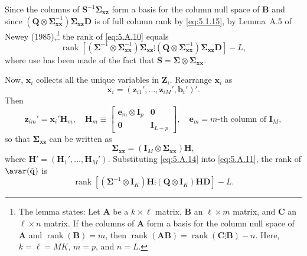 Since the columns of $\mathbf{S}^{-1}\boldsymbol{\Sigma}_{\mathbf{xz}}$ form a basis for the column null space of $\mathbf{B}$ and
since $(\mathbf{Q} \otimes \boldsymbol{\Sigma}_{\mathbf{xx}}^{-1})\boldsymbol{\Sigma}_{\mathbf{xz}}\mathbf{D}$
is of full column rank by \eqref{eq:5.1.15}, by Lemma~A.5 of Newey
(1985),\footnote{The lemma states: Let $\mathbf{A}$ be a $k \times \ell$ matrix,
$\mathbf{B}$ an $\ell \times m$ matrix, and $\mathbf{C}$ an $\ell \times n$ matrix.
If the columns of $\mathbf{A}$ form a basis for the column null space of $\mathbf{A}$ and
$\operatorname{rank}(\mathbf{B}) = m$, then $\operatorname{rank}(\mathbf{AB}) = \operatorname{rank}(\mathbf{C} \vdots \mathbf{B}) - n$.
Here, $k = \ell = MK$, $m = p$, and $n = L$.}
the rank of \eqref{eq:5.A.10} equals
\begin{equation}
  \operatorname{rank}[(\boldsymbol{\Sigma}^{-1} \otimes \boldsymbol{\Sigma}_{\mathbf{xx}}^{-1})\boldsymbol{\Sigma}_{\mathbf{xz}}
  \vdots (\mathbf{Q} \otimes \boldsymbol{\Sigma}_{\mathbf{xx}}^{-1})\boldsymbol{\Sigma}_{\mathbf{xz}}\mathbf{D}] - L,
  \label{eq:5.A.11} \tag{5.A.11}
\end{equation}
where use has been made of the fact that
$\mathbf{S} = \boldsymbol{\Sigma} \otimes \boldsymbol{\Sigma}_{\mathbf{xx}}$.

Now, $\mathbf{x}_i$ collects all the unique variables in $\mathbf{Z}_i$. Rearrange $\mathbf{x}_i$ as
\begin{equation}
  \mathbf{x}_i = (\mathbf{z}_{i1}', \ldots, \mathbf{z}_{iM}', \mathbf{b}_i')'.
  \label{eq:5.A.12} \tag{5.A.12}
\end{equation}
Then
\begin{equation}
  \mathbf{z}_{im}' = \mathbf{x}_i'\mathbf{H}_m, \quad
  \mathbf{H}_m \equiv \begin{bmatrix}
    \mathbf{e}_m \otimes \mathbf{I}_p & \mathbf{0} \\
    \mathbf{0} & \mathbf{I}_{L-p}
  \end{bmatrix}, \quad
  \mathbf{e}_m = m\text{-th column of } \mathbf{I}_M,
  \label{eq:5.A.13} \tag{5.A.13}
\end{equation}
so that $\boldsymbol{\Sigma}_{\mathbf{xz}}$ can be written as
\begin{equation}
  \boldsymbol{\Sigma}_{\mathbf{xz}} = (\mathbf{I}_M \otimes \boldsymbol{\Sigma}_{\mathbf{xx}})\mathbf{H},
  \label{eq:5.A.14} \tag{5.A.14}
\end{equation}
where $\mathbf{H}' = (\mathbf{H}_1', \ldots, \mathbf{H}_M')$.
Substituting \eqref{eq:5.A.14} into \eqref{eq:5.A.11}, the rank of
$\avar(\hat{\mathbf{q}})$ is
\[
  \operatorname{rank}[(\boldsymbol{\Sigma}^{-1} \otimes \mathbf{I}_K)\mathbf{H}
  \vdots (\mathbf{Q} \otimes \mathbf{I}_K)\mathbf{H}\mathbf{D}] - L.
\]

